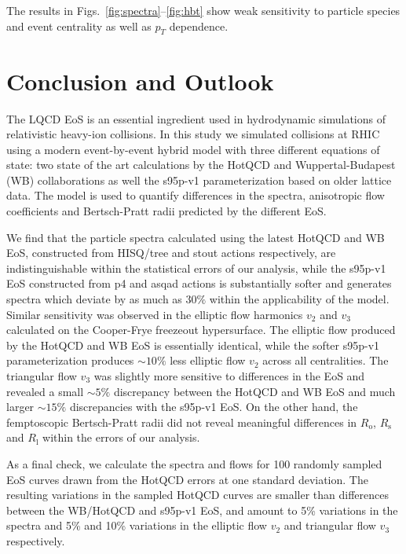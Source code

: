 \documentclass[aps,prc,reprint,amsmath,nofootinbib,superscriptaddress]{revtex4-1}
\begin{document}
The results in Figs.~\ref{fig:spectra}--\ref{fig:hbt} show weak sensitivity to particle species and event centrality as well as $p_T$ dependence. 

\section{Conclusion and Outlook}
\label{conclusion}

The LQCD EoS is an essential ingredient used in hydrodynamic simulations of relativistic heavy-ion collisions. In this study we simulated collisions at RHIC using a modern event-by-event hybrid model with three different equations of state: 
two state of the art calculations by the HotQCD and Wuppertal-Budapest (WB) collaborations as well the s95p-v1 parameterization based on older lattice data. The model is used to quantify differences in the spectra, anisotropic flow coefficients and 
Bertsch-Pratt radii predicted by the different EoS. 

We find that the particle spectra calculated using the latest HotQCD and WB EoS, constructed from HISQ/tree and stout actions respectively, are indistinguishable within the statistical errors of our analysis, while the s95p-v1 EoS constructed from p4 and asqad actions is substantially softer and generates spectra which deviate by as much as $30\%$ within the applicability of the model. 
Similar sensitivity was observed in the elliptic flow harmonics $v_2$ and $v_3$ calculated on the Cooper-Frye freezeout hypersurface. The elliptic flow produced by the HotQCD and WB EoS is essentially identical, while the softer s95p-v1 parameterization produces ${\sim}10\%$ less elliptic flow $v_2$ across all centralities. The triangular flow $v_3$ was slightly more sensitive to differences in the EoS and revealed a small ${\sim} 5\%$ discrepancy between the HotQCD and WB EoS and much larger ${\sim}15\%$ discrepancies with the s95p-v1 EoS. 
On the other hand, the femptoscopic Bertsch-Pratt radii did not reveal meaningful differences in $R_\text{o}$, $R_\text{s}$ and $R_\text{l}$ within the errors of our analysis. 

As a final check, we calculate the spectra and flows for 100 randomly sampled EoS curves drawn from the HotQCD errors at one standard deviation. The resulting variations in the sampled HotQCD curves are smaller than differences between the WB/HotQCD and s95p-v1 EoS, and amount to 
5\% variations in the spectra and 5\% and 10\% variations in the elliptic flow $v_2$ and triangular flow $v_3$ respectively. 
\end{document}
